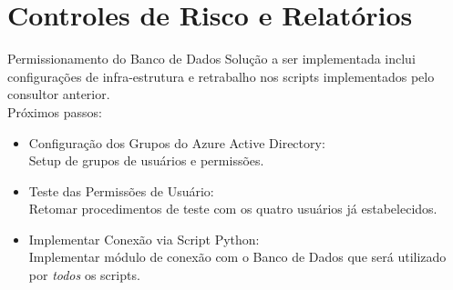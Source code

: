 \documentclass[t,aspectratio=169]{beamer}
\begin{document}
\section[Risco]{Controles de Risco e Relatórios}
\begin{frame}{Permissionamento do Banco de Dados}
	Solução a ser implementada inclui configurações de infra-estrutura e retrabalho nos scripts implementados pelo consultor anterior.\\
	Próximos passos:
	\begin{itemize}
		\item {\color{blue1} Configuração dos Grupos do Azure Active Directory:}\\
		\large{Setup de grupos de usuários e permissões.}\\
		\item {\color{blue1} Teste das Permissões de Usuário:}\\
		\large{Retomar procedimentos de teste com os quatro usuários já estabelecidos.}\\
		\item {\color{blue1} Implementar Conexão via Script Python:}\\
		\large{Implementar módulo de conexão com o Banco de Dados que será utilizado por \emph{todos} os scripts.}\\
	\end{itemize}
\end{frame}
\end{document}
